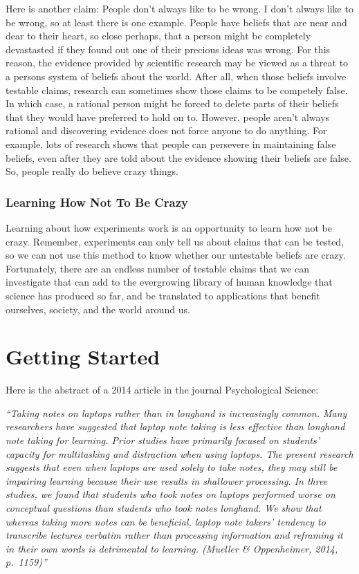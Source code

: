 \documentclass[]{book}
\theoremstyle{definition}
\theoremstyle{definition}
\theoremstyle{remark}
\begin{document}
Here is another claim: People don't always like to be wrong. I don't
always like to be wrong, so at least there is one example. People have
beliefs that are near and dear to their heart, so close perhaps, that a
person might be completely devastasted if they found out one of their
precious ideas was wrong. For this reason, the evidence provided by
scientific research may be viewed as a threat to a persons system of
beliefs about the world. After all, when those beliefs involve testable
claims, research can sometimes show those claims to be competely false.
In which case, a rational person might be forced to delete parts of
their beliefs that they would have preferred to hold on to. However,
people aren't always rational and discovering evidence does not force
anyone to do anything. For example, lots of research shows that people
can persevere in maintaining false beliefs, even after they are told
about the evidence showing their beliefs are false. So, people really do
believe crazy things.

\subsection{Learning How Not To Be
Crazy}\label{learning-how-not-to-be-crazy}

Learning about how experiments work is an opportunity to learn how not
be crazy. Remember, experiments can only tell us about claims that can
be tested, so we can not use this method to know whether our untestable
beliefs are crazy. Fortunately, there are an endless number of testable
claims that we can investigate that can add to the evergrowing library
of human knowledge that science has produced so far, and be translated
to applications that benefit ourselves, society, and the world around
us.

\chapter{Getting Started}\label{getting-started}

Here is the abstract of a 2014 article in the journal Psychological
Science:

\emph{``Taking notes on laptops rather than in longhand is increasingly
common. Many researchers have suggested that laptop note taking is less
effective than longhand note taking for learning. Prior studies have
primarily focused on students' capacity for multitasking and distraction
when using laptops. The present research suggests that even when laptops
are used solely to take notes, they may still be impairing learning
because their use results in shallower processing. In three studies, we
found that students who took notes on laptops performed worse on
conceptual questions than students who took notes longhand. We show that
whereas taking more notes can be beneficial, laptop note takers'
tendency to transcribe lectures verbatim rather than processing
information and reframing it in their own words is detrimental to
learning. (Mueller \& Oppenheimer, 2014, p.~1159)''}
\end{document}
